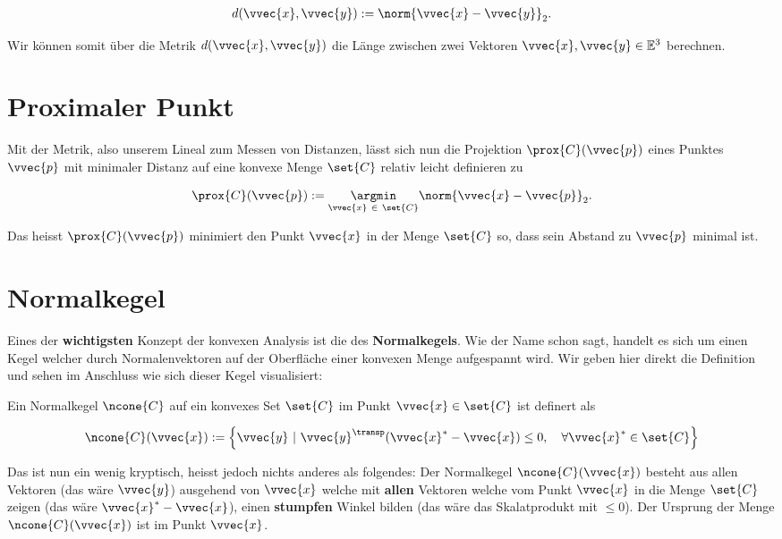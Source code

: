 \documentclass[
  12pt,
  a4paper,
  twoside,
  titlepage,
  openright,
  numbers=noenddot,
  chapterprefix=true,
  headings=optiontohead,
  svgnames,
  dvipsnames]{scrreprt}
\begin{document}
\[\begin{align}
d(\vvec{x},\vvec{y}) := \norm{\vvec{x} - \vvec{y}}_2.
\end{align}\]

Wir können somit über die Metrik \(d(\vvec{x},\vvec{y})\) die Länge
zwischen zwei Vektoren \(\vvec{x},\vvec{y} \in \mathbb{E}^3\) berechnen.

\hypertarget{proximaler-punkt}{%
\section{Proximaler Punkt}\label{proximaler-punkt}}

Mit der Metrik, also unserem Lineal zum Messen von Distanzen, lässt sich
nun die Projektion \(\prox{C}(\vvec{p})\) eines Punktes \(\vvec{p}\) mit
minimaler Distanz auf eine konvexe Menge \(\set{C}\) relativ leicht
definieren zu

\[\begin{align}
\prox{C}(\vvec{p}) :=  \underset{\vvec{x} \ \in \ \set{C}}{\argmin} \norm{\vvec{x} - \vvec{p}}_2.
\end{align}\]

Das heisst \(\prox{C}(\vvec{p})\) minimiert den Punkt \(\vvec{x}\) in
der Menge \(\set{C}\) so, dass sein Abstand zu \(\vvec{p}\) minimal ist.

\hypertarget{normalkegel}{%
\section{Normalkegel}\label{normalkegel}}

Eines der \textbf{wichtigsten} Konzept der konvexen Analysis ist die des
\textbf{Normalkegels}. Wie der Name schon sagt, handelt es sich um einen
Kegel welcher durch Normalenvektoren auf der Oberfläche einer konvexen
Menge aufgespannt wird. Wir geben hier direkt die Definition und sehen
im Anschluss wie sich dieser Kegel visualisiert:

Ein Normalkegel \(\ncone{C}\) auf ein konvexes Set \(\set{C}\) im Punkt
\(\vvec{x} \in \set{C}\) ist definert als

\[\begin{align}
    \ncone{C}(\vvec{x}) := \left\{ \vvec{y} \ | \ \vvec{y}^\transp(\vvec{x}^* - \vvec{x}) \leq 0, \quad \forall \vvec{x}^* \in \set{C} \right\}
\end{align}\]

Das ist nun ein wenig kryptisch, heisst jedoch nichts anderes als
folgendes: Der Normalkegel \(\ncone{C}(\vvec{x})\) besteht aus allen
Vektoren (das wäre \(\vvec{y}\)) ausgehend von \(\vvec{x}\) welche mit
\textbf{allen} Vektoren welche vom Punkt \(\vvec{x}\) in die Menge
\(\set{C}\) zeigen (das wäre \(\vvec{x}^* - \vvec{x}\)), einen
\textbf{stumpfen} Winkel bilden (das wäre das Skalatprodukt mit
\(\leq 0\)). Der Ursprung der Menge \(\ncone{C}(\vvec{x})\) ist im Punkt
\(\vvec{x}\).
\end{document}
